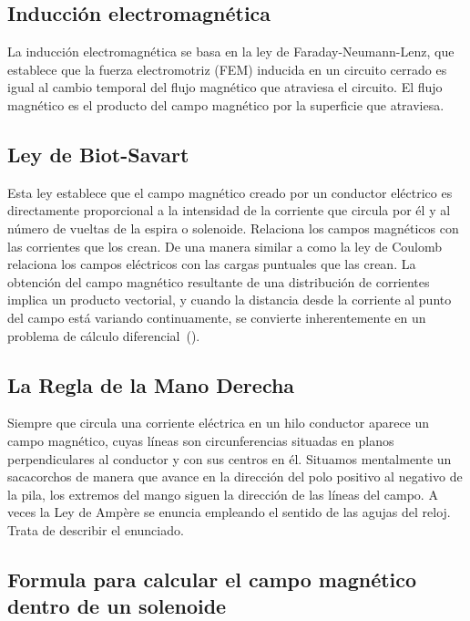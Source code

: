 \documentclass[twocolumn, 12pt]{article}
\begin{document}
\subsection*{Inducción electromagnética}

La inducción electromagnética se basa en la ley de
Faraday-Neumann-Lenz, que establece que la fuerza
electromotriz (FEM) inducida en un circuito cerrado es
igual al cambio temporal del flujo magnético que atraviesa
el circuito. El flujo magnético es el producto del campo
magnético por la superficie que atraviesa.

\subsection*{Ley de Biot-Savart}

Esta ley establece que el campo magnético creado por un
conductor eléctrico es directamente proporcional a la
intensidad de la corriente que circula por él y al número
de vueltas de la espira o solenoide. Relaciona los campos
magnéticos con las corrientes que los crean. De una manera
similar a como la ley de Coulomb relaciona los campos
eléctricos con las cargas puntuales que las crean. La
obtención del campo magnético resultante de una
distribución de corrientes implica un producto vectorial, y
cuando la distancia desde la corriente al punto del campo
está variando continuamente, se convierte inherentemente en
un problema de cálculo
diferencial~(\textcite{biot-savart-law}).

\subsection*{La Regla de la Mano Derecha}

Siempre que circula una corriente eléctrica en un hilo
conductor aparece un campo magnético, cuyas líneas son
circunferencias situadas en planos perpendiculares al
conductor y con sus centros en él. Situamos mentalmente un
sacacorchos de manera que avance en la dirección del polo
positivo al negativo de la pila, los extremos del mango
siguen la dirección de las líneas del campo. A veces la Ley
de Ampère se enuncia empleando el sentido de las agujas del
reloj. Trata de describir el enunciado.

\subsection*{Formula para calcular el campo magnético dentro de un solenoide}
\end{document}
